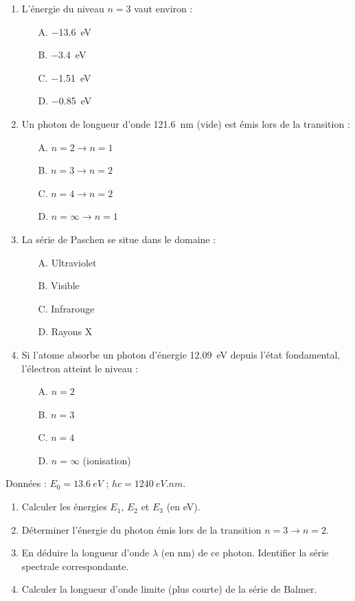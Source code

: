 \documentclass[11pt]{article}
\begin{document}
\begin{exercice}
\begin{enumerate}
    \item L'énergie du niveau $n=3$ vaut environ :
    \begin{itemize}
        \item[A.] \SI{-13,6}{eV}
        \item[B.] \SI{-3,4}{eV}
        \item[C.] \SI{-1,51}{eV}
        \item[D.] \SI{-0,85}{eV}
    \end{itemize}
    \item Un photon de longueur d'onde \SI{121,6}{nm} (vide) est émis lors de la transition :
    \begin{itemize}
        \item[A.] $n=2 \to n=1$
        \item[B.] $n=3 \to n=2$
        \item[C.] $n=4 \to n=2$
        \item[D.] $n=\infty \to n=1$
    \end{itemize}
    \item La série de Paschen se situe dans le domaine :
    \begin{itemize}
        \item[A.] Ultraviolet
        \item[B.] Visible
        \item[C.] Infrarouge
        \item[D.] Rayons X
    \end{itemize}
    \item Si l'atome absorbe un photon d'énergie \SI{12,09}{eV} depuis l'état fondamental, l'électron atteint le niveau :
    \begin{itemize}
        \item[A.] $n=2$
        \item[B.] $n=3$
        \item[C.] $n=4$
        \item[D.] $n=\infty$ (ionisation)
    \end{itemize}
\end{enumerate}
\end{exercice}

\begin{exercice}
Données : $E_0 = \SI{13,6}{eV}$ ; $hc = \SI{1240}{eV.nm}$.
\begin{enumerate}
    \item Calculer les énergies $E_1$, $E_2$ et $E_3$ (en eV).
    \item Déterminer l'énergie du photon émis lors de la transition $n=3 \to n=2$.
    \item En déduire la longueur d'onde $\lambda$ (en nm) de ce photon. Identifier la série spectrale correspondante.
    \item Calculer la longueur d'onde limite (plus courte) de la série de Balmer.
\end{enumerate}
\end{exercice}
\end{document}
